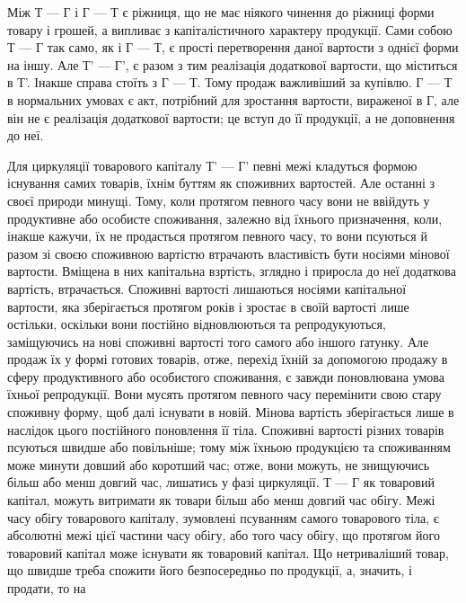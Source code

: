 Між Т — Г і Г — Т є ріжниця, що не має ніякого чинення до ріжниці
форми товару і грошей, а випливає з капіталістичного характеру
продукції. Сами собою Т — Г так само, як і Г — Т, є прості перетворення
даної вартости з однієї форми на іншу. Але Т' — Г', є разом з тим
реалізація додаткової вартости, що міститься в Т'. Інакше справа стоїть з
Г — Т. Тому продаж важливіший за купівлю. Г — Т в нормальних умовах
є акт, потрібний для зростання вартости, вираженої в Г, але він не є
реалізація додаткової вартости; це вступ до її продукції, а не доповнення
до неї.

Для циркуляції товарового капіталу Т' — Г' певні межі кладуться
формою існування самих товарів, їхнім буттям як споживних вартостей.
Але останні з своєї природи минущі. Тому, коли протягом певного часу
вони не ввійдуть у продуктивне або особисте споживання, залежно від
їхнього призначення, коли, інакше кажучи, їх не продасться протягом
певного часу, то вони псуються й разом зі своєю споживною вартістю
втрачають властивість бути носіями мінової вартости. Вміщена в них
капітальна взртість, зглядно і приросла до неї додаткова вартість, втрачається.
Споживні вартості лишаються носіями капітальної вартости, яка
зберігається протягом років і зростає в своїй вартості лише остільки,
оскільки вони постійно відновлюються та репродукуються, заміщуючись
на нові споживні вартості того самого або іншого ґатунку. Але продаж
їх у формі готових товарів, отже, перехід їхній за допомогою продажу
в сферу продуктивного або особистого споживання, є завжди поновлювана
умова їхньої репродукції. Вони мусять протягом певного часу
перемінити свою стару споживну форму, щоб далі існувати в новій.
Мінова вартість зберігається лише в наслідок цього постійного поновлення
її тіла. Споживні вартості різних товарів псуються швидше
або повільніше; тому між їхньою продукцією та споживанням може
минути довший або коротший час; отже, вони можуть, не знищуючись
більш або менш довгий час, лишатись у фазі циркуляції. Т — Г
як товаровий капітал, можуть витримати як товари більш або менш
довгий час обігу. Межі часу обігу товарового капіталу, зумовлені псуванням
самого товарового тіла, є абсолютні межі цієї частини часу обігу,
або того часу обігу, що протягом його товаровий капітал може існувати
як товаровий капітал. Що нетриваліший товар, що швидше треба
спожити його безпосередньо по продукції, а, значить, і продати, то на
\parbreak{}  %
